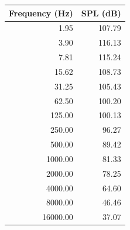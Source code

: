 \documentclass[onecolumn,10pt]{jhwhw}
\begin{document}
\begin{multicols}{2}
\begin{tabular}{rr}
\toprule
Frequency (Hz) &         SPL (dB) \\
\midrule
   1.95 &  107.79 \\
   3.90 &  116.13 \\
   7.81 &  115.24 \\
  15.62 &  108.73 \\
  31.25 &  105.43 \\
  62.50 &  100.20 \\
 125.00 &  100.13 \\
 250.00 &   96.27 \\
 500.00 &   89.42 \\
1000.00 &   81.33 \\
2000.00 &   78.25 \\
4000.00 &   64.60 \\
8000.00 &   46.46 \\
16000.00 &  37.07 \\
\bottomrule
\end{tabular}
\end{multicols}

\clearpage

\end{document}
